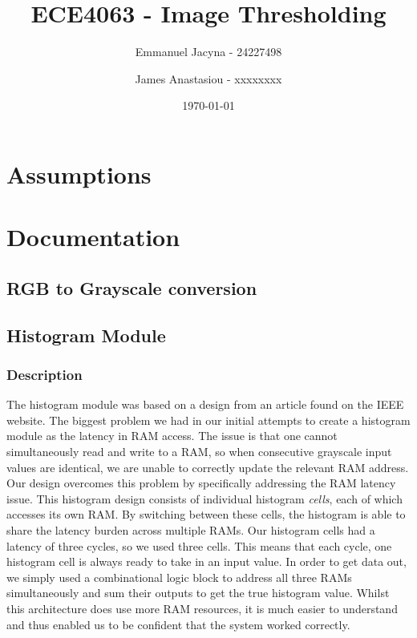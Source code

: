 \documentclass[12pt]{article}
\title{ECE4063 - Image Thresholding}
\author{Emmanuel Jacyna - 24227498 \and James Anastasiou - xxxxxxxx}
\date{\today}
\begin{document}
\pagestyle{myheadings}
  \maketitle
  \tableofcontents
  
  \section{Assumptions}
  
  \section{Documentation}
  \subsection{RGB to Grayscale conversion}
  
  \subsection{Histogram Module}
  \subsubsection{Description}
  The histogram module was based on a design from an article found on the IEEE website. The biggest problem we had in our initial attempts to create a histogram module as the latency in RAM access. The issue is that one cannot simultaneously read and write to a RAM, so when consecutive grayscale input values are identical, we are unable to correctly update the relevant RAM address. Our design overcomes this problem by specifically addressing the RAM latency issue. This histogram design consists of individual histogram \textit{cells}, each of which accesses its own RAM. By switching between these cells, the histogram is able to share the latency burden across multiple RAMs. Our histogram cells had a latency of three cycles, so we used three cells. This means that each cycle, one histogram cell is always ready to take in an input value. In order to get data out, we simply used a combinational logic block to address all three RAMs simultaneously and sum their outputs to get the true histogram value. Whilst this architecture does use more RAM resources, it is much easier to understand and thus enabled us to be confident that the system worked correctly.
\end{document}
